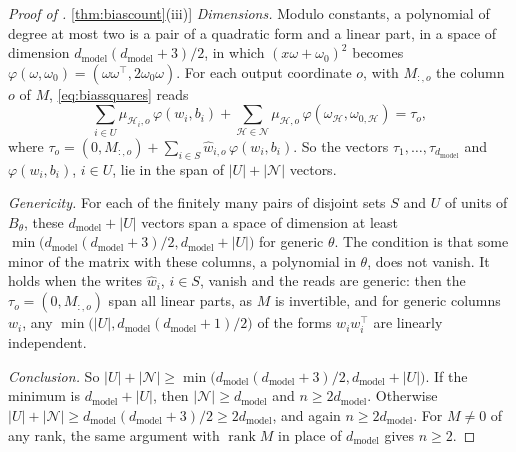 \documentclass[10pt]{article}
\theoremstyle{definition}
\theoremstyle{remark}
\newcommand{\dm}{d_{\mathrm{model}}}
\DeclareRobustCommand{\cpref}[2]{\hyperref[#1:#2]{\cref*{#1}(#2)}}
\begin{document}
\begin{proof}[Proof of \cpref{thm:biascount}{iii}]
\emph{Dimensions.} Modulo constants, a polynomial of degree at most two is a pair of a quadratic form and a linear part, in a space of dimension $\dm(\dm+3)/2$, in which $(x\omega + \omega_0)^2$ becomes $\varphi(\omega, \omega_0) = (\omega\omega^\top, 2\omega_0\omega)$. For each output coordinate $o$, with $M_{:,o}$ the column $o$ of $M$, \eqref{eq:biassquares} reads
\[
\textstyle\sum_{i\in U}\mu_{\mathcal H_i,o}\,\varphi(w_i, b_i) + \sum_{\mathcal H\in\mathcal N}\mu_{\mathcal H,o}\,\varphi(\omega_{\mathcal H}, \omega_{0,\mathcal H}) = \tau_o,
\]
where $\tau_o = (0, M_{:,o}) + \sum_{i\in S}\hat w_{i,o}\,\varphi(w_i, b_i)$. So the vectors $\tau_1, \dots, \tau_{\dm}$ and $\varphi(w_i, b_i)$, $i \in U$, lie in the span of $\lvert U\rvert + \lvert\mathcal N\rvert$ vectors.

\emph{Genericity.} For each of the finitely many pairs of disjoint sets $S$ and $U$ of units of $B_\theta$, these $\dm + \lvert U\rvert$ vectors span a space of dimension at least $\min\big(\dm(\dm+3)/2, \dm + \lvert U\rvert\big)$ for generic $\theta$. The condition is that some minor of the matrix with these columns, a polynomial in $\theta$, does not vanish. It holds when the writes $\hat w_i$, $i \in S$, vanish and the reads are generic: then the $\tau_o = (0, M_{:,o})$ span all linear parts, as $M$ is invertible, and for generic columns $w_i$, any $\min\big(\lvert U\rvert, \dm(\dm+1)/2\big)$ of the forms $w_iw_i^\top$ are linearly independent.

\emph{Conclusion.} So $\lvert U\rvert + \lvert\mathcal N\rvert \ge \min\big(\dm(\dm+3)/2, \dm + \lvert U\rvert\big)$. If the minimum is $\dm + \lvert U\rvert$, then $\lvert\mathcal N\rvert \ge \dm$ and $n \ge 2\dm$. Otherwise $\lvert U\rvert + \lvert\mathcal N\rvert \ge \dm(\dm+3)/2 \ge 2\dm$, and again $n \ge 2\dm$. For $M \neq 0$ of any rank, the same argument with $\operatorname{rank}M$ in place of $\dm$ gives $n \ge 2$.
\end{proof}
\end{document}
